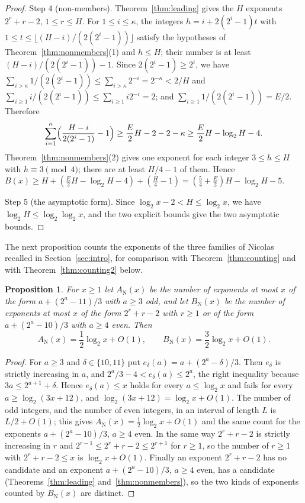 \documentclass[11pt]{amsart}
\newtheorem{Proposition}[Theorem]{Proposition}
\theoremstyle{definition}
\begin{document}
\begin{proof}
Step 4 (non-members). Theorem~\ref{thm:leading} gives the $H$ exponents $2^r+r-2$, $1\le r\le H$. For $1\le i\le\kappa$, the integers $h=i+2(2^i-1)t$ with $1\le t\le\lfloor(H-i)/(2(2^i-1))\rfloor$ satisfy the hypotheses of Theorem~\ref{thm:nonmembers}(1) and $h\le H$; their number is at least $(H-i)/(2(2^i-1))-1$. Since $2(2^i-1)\ge2^i$, we have $\sum_{i>\kappa}1/(2(2^i-1))\le\sum_{i>\kappa}2^{-i}=2^{-\kappa}<2/H$ and $\sum_{i\ge1}i/(2(2^i-1))\le\sum_{i\ge1}i2^{-i}=2$; and $\sum_{i\ge1}1/(2(2^i-1))=E/2$. Therefore
\[
\sum_{i=1}^{\kappa}\Bigl(\frac{H-i}{2(2^i-1)}-1\Bigr)\ge\frac E2H-2-2-\kappa\ge\frac E2H-\log_2H-4.
\]
Theorem~\ref{thm:nonmembers}(2) gives one exponent for each integer $3\le h\le H$ with $h\equiv3\pmod4$; there are at least $H/4-1$ of them. Hence $B(x)\ge H+(\frac E2H-\log_2H-4)+(\frac H4-1)=(\frac54+\frac E2)H-\log_2H-5$.

Step 5 (the asymptotic form). Since $\log_2x-2<H\le\log_2x$, we have $\log_2H\le\log_2\log_2x$, and the two explicit bounds give the two asymptotic bounds.
\end{proof}

The next proposition counts the exponents of the three families of Nicolas~\cite{nicolas2005open} recalled in Section~\ref{sec:intro}, for comparison with Theorem~\ref{thm:counting} and with Theorem~\ref{thm:counting2} below.

\begin{Proposition}
\label{prop:nicolascount}
For $x\ge1$ let $A_{\mathrm{N}}(x)$ be the number of exponents at most $x$ of the form $a+(2^a-11)/3$ with $a\ge3$ odd, and let $B_{\mathrm{N}}(x)$ be the number of exponents at most $x$ of the form $2^r+r-2$ with $r\ge1$ or of the form $a+(2^a-10)/3$ with $a\ge4$ even. Then
\[
A_{\mathrm{N}}(x)=\frac12\log_2x+O(1),\qquad B_{\mathrm{N}}(x)=\frac32\log_2x+O(1).
\]
\end{Proposition}
\begin{proof}
For $a\ge3$ and $\delta\in\{10,11\}$ put $e_\delta(a)=a+(2^a-\delta)/3$. Then $e_\delta$ is strictly increasing in $a$, and $2^a/3-4<e_\delta(a)\le2^a$, the right inequality because $3a\le2^{a+1}+\delta$. Hence $e_\delta(a)\le x$ holds for every $a\le\log_2x$ and fails for every $a\ge\log_2(3x+12)$, and $\log_2(3x+12)=\log_2x+O(1)$. The number of odd integers, and the number of even integers, in an interval of length $L$ is $L/2+O(1)$; this gives $A_{\mathrm{N}}(x)=\frac12\log_2x+O(1)$ and the same count for the exponents $a+(2^a-10)/3$, $a\ge4$ even. In the same way $2^r+r-2$ is strictly increasing in $r$ and $2^{r-1}\le2^r+r-2\le2^{r+1}$ for $r\ge1$, so the number of $r\ge1$ with $2^r+r-2\le x$ is $\log_2x+O(1)$. Finally an exponent $2^r+r-2$ has no candidate and an exponent $a+(2^a-10)/3$, $a\ge4$ even, has a candidate (Theorems~\ref{thm:leading} and~\ref{thm:nonmembers}), so the two kinds of exponents counted by $B_{\mathrm{N}}(x)$ are distinct.
\end{proof}
\end{document}
